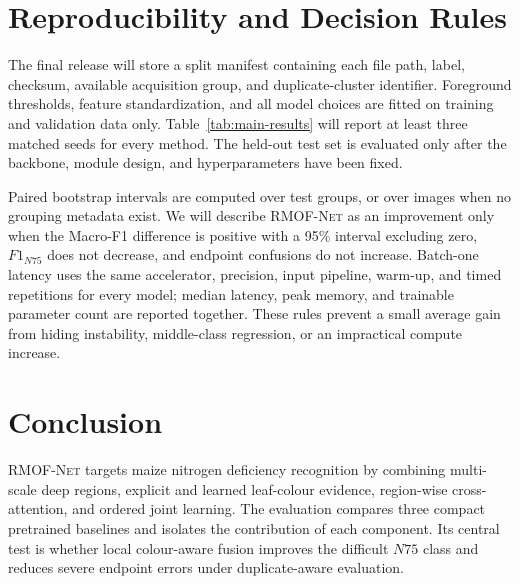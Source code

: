 \documentclass[conference]{IEEEtran}
\newcommand{\rmofnet}{\textsc{RMOF-Net}\xspace}
\begin{document}
\section{Reproducibility and Decision Rules}
The final release will store a split manifest containing each file path, label, checksum, available acquisition group, and duplicate-cluster identifier. Foreground thresholds, feature standardization, and all model choices are fitted on training and validation data only. Table~\ref{tab:main-results} will report at least three matched seeds for every method. The held-out test set is evaluated only after the backbone, module design, and hyperparameters have been fixed.

Paired bootstrap intervals are computed over test groups, or over images when no grouping metadata exist. We will describe \rmofnet as an improvement only when the Macro-F1 difference is positive with a 95\% interval excluding zero, $F1_{N75}$ does not decrease, and endpoint confusions do not increase. Batch-one latency uses the same accelerator, precision, input pipeline, warm-up, and timed repetitions for every model; median latency, peak memory, and trainable parameter count are reported together. These rules prevent a small average gain from hiding instability, middle-class regression, or an impractical compute increase.

\section{Conclusion}
\rmofnet targets maize nitrogen deficiency recognition by combining multi-scale deep regions, explicit and learned leaf-colour evidence, region-wise cross-attention, and ordered joint learning. The evaluation compares three compact pretrained baselines and isolates the contribution of each component. Its central test is whether local colour-aware fusion improves the difficult $N75$ class and reduces severe endpoint errors under duplicate-aware evaluation.

\clearpage


\end{document}

